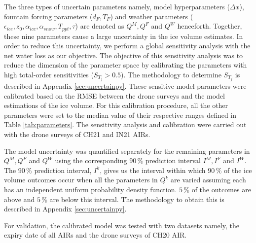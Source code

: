 The three types of uncertain parameters namely, model hyperparameters ($\Delta x$), fountain forcing parameters
($d_F, T_F$) and weather parameters ($\epsilon_{ice}, z_0, \alpha_{ice}, \alpha_{snow}, T_{ppt}, \tau$) are
denoted as $Q^M, Q^F$ and $Q^W$ henceforth. Together, these nine parameters cause a large uncertainty in the ice
volume estimates. In order to reduce this uncertainty, we perform a global sensitivity analysis with the net
water loss as our objective. The objective of this sensitivity analysis was to reduce the dimension of the
parameter space by calibrating the parameters with high total-order sensitivities ($S_{T_{j}} > 0.5$). The
methodology to determine $S_{T_{j}}$ is described in Appendix \ref{sec:uncertainpy}. These sensitive model
parameters were calibrated based on the \ac{RMSE} between the drone surveys and the model
estimations of the ice volume. For this calibration procedure, all the other parameters were set to the median
value of their respective ranges defined in Table \ref{tab:parameters}.  The sensitivity analysis and
calibration were carried out with the drone surveys of CH21 and IN21 \ac{AIRs}. 

The model uncertainty was quantified separately for the remaining parameters in $Q^M, Q^F$ and $Q^W$ using the
corresponding $90\, \%$ prediction interval $I^M, I^F$ and $I^W$. The $90\, \%$ prediction interval, $I^k$, gives us the
interval within which $90\,\%$ of the ice volume outcomes occur when all the parameters in $Q^k$ are varied
assuming each has an independent uniform probability density function. $5\,\%$ of the outcomes are above and
$5\,\%$ are below this interval. The methodology to obtain this is described in Appendix \ref{sec:uncertainpy}.

For validation, the calibrated model was tested with two datasets namely, the expiry date of all \ac{AIRs} and the
drone surveys of CH20 AIR.

